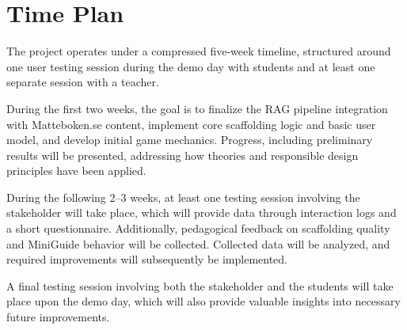 \section{Time Plan}


The project operates under a compressed five-week timeline, structured around one user testing session during the demo day with students and at least one separate session with a teacher.

During the first two weeks, the goal is to finalize the RAG pipeline integration with Matteboken.se content, implement core scaffolding logic and basic user model, and develop initial game mechanics. Progress, including preliminary results will be presented, addressing how theories and responsible design principles have been applied.

During the following 2--3 weeks, at least one testing session involving the stakeholder will take place, which will provide data through interaction logs and a short questionnaire. Additionally, pedagogical feedback on scaffolding quality and MiniGuide behavior will be collected. Collected data will be analyzed, and required improvements will subsequently be implemented.

A final testing session involving both the stakeholder and the students will take place upon the demo day, which will also provide valuable insights into necessary future improvements.